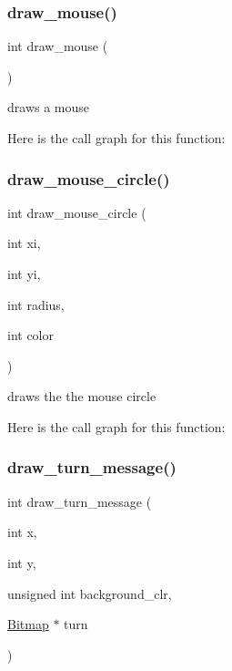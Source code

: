 \subsubsection{\texorpdfstring{draw\+\_\+mouse()}{draw\_mouse()}}
{\footnotesize\ttfamily int draw\+\_\+mouse (\begin{DoxyParamCaption}{ }\end{DoxyParamCaption})}



draws a mouse 

Here is the call graph for this function\+:
\hypertarget{group___checkers_ga0580c6365cfa09e2d8a30d3d47f3adb1}{}\label{group___checkers_ga0580c6365cfa09e2d8a30d3d47f3adb1} 
\subsubsection{\texorpdfstring{draw\+\_\+mouse\+\_\+circle()}{draw\_mouse\_circle()}}
{\footnotesize\ttfamily int draw\+\_\+mouse\+\_\+circle (\begin{DoxyParamCaption}\item[{int}]{xi,  }\item[{int}]{yi,  }\item[{int}]{radius,  }\item[{int}]{color }\end{DoxyParamCaption})}



draws the the mouse circle 

Here is the call graph for this function\+:
\hypertarget{group___checkers_ga01bdfba712e2ceab4902f5cd63f6b482}{}\label{group___checkers_ga01bdfba712e2ceab4902f5cd63f6b482} 
\subsubsection{\texorpdfstring{draw\+\_\+turn\+\_\+message()}{draw\_turn\_message()}}
{\footnotesize\ttfamily int draw\+\_\+turn\+\_\+message (\begin{DoxyParamCaption}\item[{int}]{x,  }\item[{int}]{y,  }\item[{unsigned int}]{background\+\_\+clr,  }\item[{\hyperlink{struct_bitmap}{Bitmap} $\ast$}]{turn }\end{DoxyParamCaption})}



